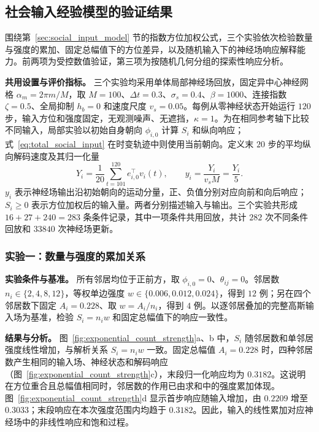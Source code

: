 \documentclass[UTF8,fontset=windows,11pt]{ctexart}
\begin{document}
\subsection{社会输入经验模型的验证结果}
\label{sec:social_input_validation}

围绕第~\ref{sec:social_input_model} 节的指数方位加权公式，三个实验依次检验数量与强度的累加、固定总幅值下的方位差异，以及随机输入下的神经场响应解释能力。前两项为受控数值验证，第三项为按随机几何分组的探索性响应分析。

\textbf{共用设置与评价指标。} 三个实验均采用单体局部神经场回放，固定异中心神经网格 $\alpha_m=2\pi m/M$，取 $M=100$、$\Delta t=0.3$、$\sigma_s=0.4$、$\beta=1000$、连接指数 $\zeta=0.5$、全局抑制 $h_b=0$ 和速度尺度 $v_s=0.05$。每例从零神经状态开始运行 $120$ 步，输入方位和强度固定，无观测噪声、无遮挡，$\kappa=1$。为在相同参考轴下比较不同输入，局部实验以初始自身朝向 $\phi_{i,0}$ 计算 $S_i$ 和纵向响应；式~\eqref{eq:total_social_input} 在时变轨迹中则使用当前朝向。定义末 $20$ 步的平均纵向解码速度及其归一化量
\begin{equation}
 Y_i=\frac{1}{20}\sum_{t=101}^{120}e_{i,0}^{\top}v_i(t),
 \qquad y_i=\frac{Y_i}{v_sM}=\frac{Y_i}{5}.
 \label{eq:local_response}
\end{equation}
$y_i$ 表示神经场输出沿初始朝向的运动分量，正、负值分别对应向前和向后响应；$S_i\geq0$ 表示方位加权后的输入量。两者分别描述输入与输出。三个实验共形成 $16+27+240=283$ 条条件记录，其中一项条件共用回放，共计 $282$ 次不同条件回放和 $33840$ 次神经场更新。

\subsubsection{实验一：数量与强度的累加关系}

\textbf{实验条件与基准。} 所有邻居均位于正前方，取 $\phi_{i,0}=0$、$\theta_{ij}=0$。邻居数 $n_i\in\{2,4,8,12\}$，等权单边强度 $w\in\{0.006,0.012,0.024\}$，得到 $12$ 例；另在四个邻居数下固定 $A_i=0.228$、取 $w=A_i/n_i$，得到 $4$ 例。以逐邻居叠加的完整高斯输入场为基准，检验 $S_i=n_iw$ 和固定总幅值下的响应一致性。

\textbf{结果与分析。} 图~\ref{fig:exponential_count_strength}a、b 中，$S_i$ 随邻居数和单邻居强度线性增加，与解析关系 $S_i=n_iw$ 一致。固定总幅值 $A_i=0.228$ 时，四种邻居数产生相同的输入场、神经状态和解码响应（图~\ref{fig:exponential_count_strength}c），末段归一化响应均为 $0.3182$。这说明在方位重合且总幅值相同时，邻居数的作用已由求和中的强度累加体现。图~\ref{fig:exponential_count_strength}d 显示首步响应随输入增加，由 $0.2209$ 增至 $0.3033$；末段响应在本次强度范围内均趋于 $0.3182$。因此，输入的线性累加对应神经场中的非线性响应和饱和过程。
\end{document}
